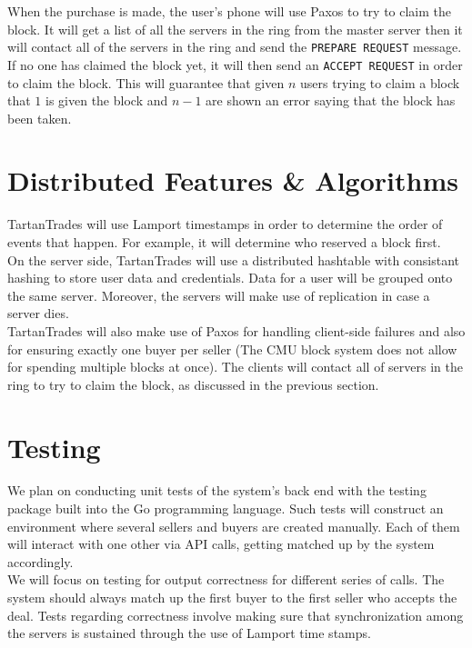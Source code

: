 \documentclass[12pt]{article}
\begin{document}
When the purchase is made, the user's phone will use Paxos to try to claim the block.  It will get a list of all the servers in the ring from the master
server then it will contact all of the servers in the ring and send the \verb|PREPARE REQUEST| message.  If no one has claimed the block yet, it will then send an \verb|ACCEPT REQUEST| in order to claim
the block.  This will guarantee that given $n$ users trying to claim a block that $1$ is given the block and $n-1$ are shown an error saying that the block has been taken.

\section{Distributed Features \& Algorithms}

TartanTrades will use Lamport timestamps in order to determine the order of events that happen.  For example, it will determine who reserved a block first.\\

On the server side, TartanTrades will use a distributed hashtable with consistant hashing to store user data and credentials.  Data for a user will be grouped onto the same server.  Moreover, the
servers will make use of replication in case a server dies.\\

TartanTrades will also make use of Paxos for handling client-side failures and also for ensuring exactly one buyer per seller (The CMU block system does not allow
for spending multiple blocks at once).  The clients will contact all of servers in the ring to try to claim the block, as discussed in the previous section.

\section{Testing}

We plan on conducting unit tests of the system's back end with the testing package built into the Go programming language. Such tests will construct an environment where several sellers and buyers are created manually. Each of them will interact with one other via API calls, getting matched up by the system accordingly.\\

We will focus on testing for output correctness for different series of calls. The system should always match up the first buyer to the first seller who accepts the deal. Tests regarding correctness involve making sure that synchronization among the servers is sustained through the use of Lamport time stamps.\\
\end{document}
